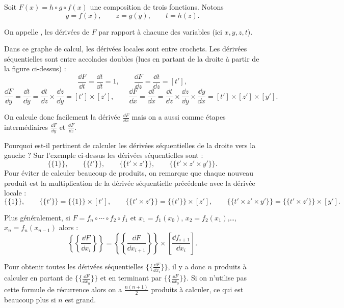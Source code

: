 \documentclass[11pt,class=report,crop=false]{standalone}
\begin{document}
Soit $F(x) = h\circ g \circ f(x)$ une composition de trois fonctions. Notons
$$y=f(x), \qquad z = g(y), \qquad t = h(z).$$

On appelle , les dérivées de $F$ par rapport à chacune des variables (ici $x,y,z,t$).


Dans ce graphe de calcul, les dérivées locales sont entre crochets.
Les dérivées séquentielles sont entre accolades doubles (lues en partant de la droite à partir de la figure ci-dessus) :
$$\frac{\dd F}{\dd t} = \frac{\dd t}{\dd t} = 1,
\qquad
\frac{\dd F}{\dd z} = \frac{\dd t}{\dd z} = [t'],
$$
$$
\frac{\dd F}{\dd y} = \frac{\dd t}{\dd y} = \frac{\dd t}{\dd z}\times\frac{\dd z}{\dd y}  = [t'] \times [z'],
\qquad
\frac{\dd F}{\dd x} = \frac{\dd t}{\dd x} = \frac{\dd t}{\dd z}\times\frac{\dd z}{\dd y}\times\frac{\dd y}{\dd x}  = [t'] \times [z'] \times [y'].
$$

On calcule donc facilement la dérivée $\frac{\dd F}{\dd x}$ mais on a aussi comme étapes intermédiaires $\frac{\dd F}{\dd y}$ et $\frac{\dd F}{\dd z}$.


Pourquoi est-il pertinent de calculer les dérivées séquentielles de la droite vers la gauche ?
Sur l'exemple ci-dessus les dérivées séquentielles sont :
$$ \{\{1\}\},
\qquad 
 \{\{t'\}\},
\qquad 
 \{\{t' \times z' \}\} ,
\qquad 
 \{\{t' \times z' \times y'\}\}.$$
Pour éviter de calculer beaucoup de produits, on remarque que chaque nouveau produit est la multiplication de la dérivée séquentielle précédente avec la dérivée locale :
$$ \{\{1\}\},
\qquad 
 \{\{t'\}\} = \{\{1\}\} \times [t'],
\qquad 
 \{\{t' \times z' \}\} =  \{\{t'\}\}\times [z'],
\qquad 
 \{\{t' \times z' \times y'\}\} = \{\{t' \times z' \}\}\times [y'].$$

\bigskip 
Plus généralement, si $F = f_n\circ \cdots \circ f_2 \circ f_1$ et $x_1 = f_1(x_0)$, $x_2 = f_2(x_1)$,\ldots, $x_n = f_n(x_{n-1})$ alors :
$$ \left\{\left\{\frac{\dd F}{\dd x_i} \right\}\right\} =  \left\{\left\{\frac{\dd F}{\dd x_{i+1}} \right\}\right\} \times \left[\frac{\dd f_{i+1}}{\dd x_{i}}\right].$$


Pour obtenir toutes les dérivées séquentielles $\{\{\frac{\dd F}{\dd x_i} \}\}$, il y a donc $n$ produits à calculer en partant de $\{\{\frac{\dd F}{\dd x_n} \}\}$ et en terminant par $\{\{\frac{\dd F}{\dd x_0} \}\}$. Si on n'utilise pas cette formule de récurrence alors on a $\frac{n(n+1)}{2}$ produits à calculer, ce qui est beaucoup plus si $n$ est grand.
\end{document}
